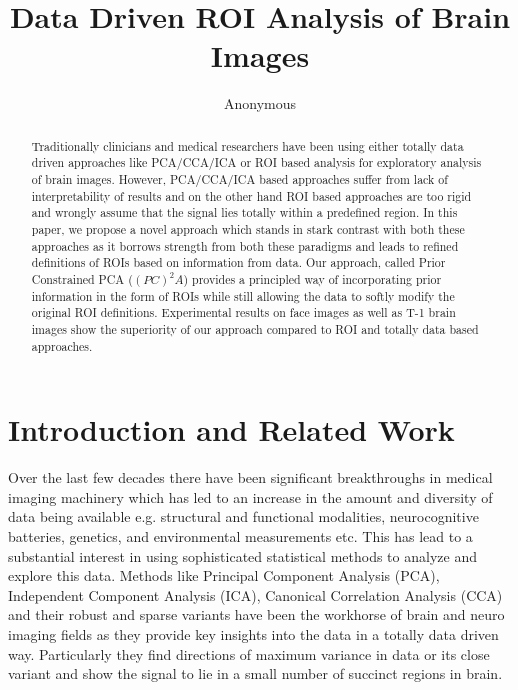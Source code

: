 \documentclass{llncs}
\begin{document}
\vspace{-0.1in}
\title{Data Driven ROI Analysis of Brain Images}
\author{Anonymous}
\maketitle              
\begin{abstract}
 Traditionally clinicians and medical researchers have been using either totally data driven approaches like PCA/CCA/ICA or ROI based analysis for exploratory analysis of brain images. However, PCA/CCA/ICA based approaches suffer from lack of interpretability of results and on the other hand ROI based approaches are too rigid and wrongly assume that the signal lies totally within a predefined region. In this paper, we propose a novel approach which stands in stark contrast with both these approaches as it borrows strength from both these paradigms and leads to refined definitions of ROIs based on information from data. Our approach, called Prior Constrained PCA ($(PC)^2A$) provides a principled way of incorporating prior information in the form of ROIs while still allowing the data to softly modify the original ROI definitions. Experimental results on face images as well as T-1 brain images show the superiority of our approach compared to ROI and totally data based approaches.    

\end{abstract}

\section{Introduction and Related Work}
Over the last  few decades there have been significant breakthroughs in medical imaging machinery which has led to an increase in the amount and diversity of data being available e.g. structural and functional modalities, neurocognitive batteries, genetics, and environmental measurements etc. This has lead to a substantial interest in using sophisticated statistical methods to analyze and explore this data. Methods like Principal Component Analysis (PCA), Independent Component Analysis (ICA), Canonical Correlation Analysis (CCA) and their robust and sparse variants have been the workhorse of brain and neuro imaging fields as they provide key insights into the data in a totally data driven way. Particularly they find directions of maximum variance in data or its close variant and show the signal to lie in a small number of succinct regions in brain. 
\end{document}
